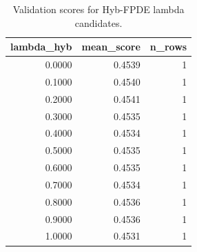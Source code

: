 \begin{table}[t]
\caption{Validation scores for Hyb-FPDE lambda candidates.}
\label{tab:lambda_distribution_computed}
\centering
\begin{tabular}{rrr}
\toprule
lambda\_hyb & mean\_score & n\_rows \\
\midrule
0.0000 & 0.4539 & 1 \\
0.1000 & 0.4540 & 1 \\
0.2000 & 0.4541 & 1 \\
0.3000 & 0.4535 & 1 \\
0.4000 & 0.4534 & 1 \\
0.5000 & 0.4535 & 1 \\
0.6000 & 0.4535 & 1 \\
0.7000 & 0.4534 & 1 \\
0.8000 & 0.4536 & 1 \\
0.9000 & 0.4536 & 1 \\
1.0000 & 0.4531 & 1 \\
\bottomrule
\end{tabular}

\end{table}
